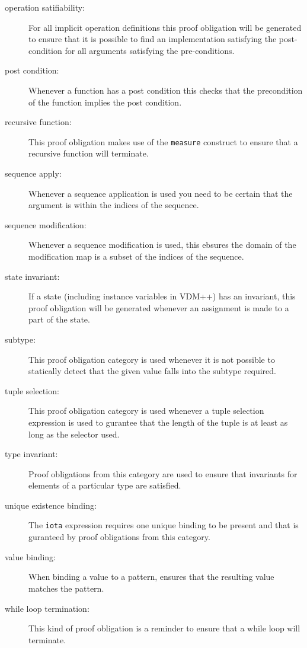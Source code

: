 \begin{description}
\item[operation satifiability:] For all implicit operation definitions
  this proof obligation will be generated to ensure that it is
  possible to find an implementation satisfying the post-condition for all
  arguments satisfying the pre-conditions.

\item[post condition:] Whenever a function has a post condition this checks that 
    the precondition of the function implies the post condition.

\item[recursive function:] This proof obligation makes use of the
  \texttt{measure} construct to ensure that a recursive function
  will terminate.

\item[sequence apply:] Whenever a sequence application is used you need to be
  certain that the argument is within the indices of the sequence.

\item[sequence modification:] Whenever a sequence modification is used, this
    ebsures the domain of the modification map is a subset of the indices of the 
    sequence.

\item[state invariant:] If a state (including instance variables in
  VDM++) has an invariant, this proof obligation will be generated
  whenever an assignment is made to a part of the state.

\item[subtype:] This proof obligation category is used whenever it is
  not possible to statically detect that the given value
  falls into the subtype required.

\item[tuple selection:] This proof obligation category is used
  whenever a tuple selection expression is used to
  gurantee that the length of the tuple is at least as long as the
  selector used.

\item[type invariant:] Proof obligations from this category are used
  to ensure that invariants for elements of a particular type are satisfied.

\item[unique existence binding:] The \texttt{iota} expression
  requires one unique binding to be present and that is guranteed by
  proof obligations from this category.

\item[value binding:] When binding a value to a pattern, ensures that the
    resulting value matches the pattern.

\item[while loop termination:] This kind of proof obligation is a
  reminder to ensure that a while loop will terminate.

\end{description}

